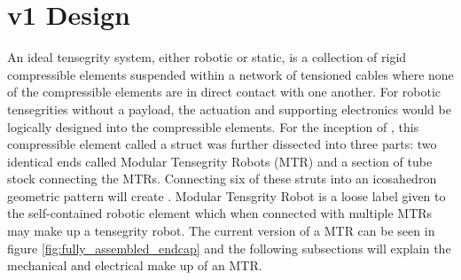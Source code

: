 \chapter{\SB{} v1 Design}
\label{design}

An ideal tensegrity system, either robotic or static, is a collection of rigid compressible elements suspended within a network of tensioned cables where none of the compressible elements are in direct contact with one another. 
For robotic tensegrities without a payload, the actuation and supporting electronics would be logically designed into the compressible elements. 
For the inception of \SB{}, this compressible element called a struct was further dissected into three parts: two identical ends called Modular Tensegrity Robots (MTR) and a section of tube stock connecting the MTRs.
Connecting six of these struts into an icosahedron geometric pattern will create \SB{}.
Modular Tensgrity Robot is a loose label given to the self-contained robotic element which when connected with multiple MTRs may make up a tensegrity robot.
The current version of a MTR can be seen in figure \ref{fig:fully_assembled_endcap} and the following subsections will explain the mechanical and electrical make up of an MTR.

